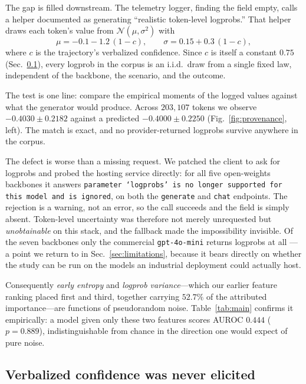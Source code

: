 \documentclass[conference]{IEEEtran}
\begin{document}
The gap is filled downstream. The telemetry logger, finding the field empty,
calls a helper documented as generating ``realistic token-level logprobs.''
That helper draws each token's value from $\mathcal{N}(\mu, \sigma^2)$ with
\begin{equation}
\mu = -0.1 - 1.2\,(1 - c), \qquad
\sigma = 0.15 + 0.3\,(1 - c),
\end{equation}
where $c$ is the trajectory's verbalized confidence. Since $c$ is itself a
constant $0.75$ (Sec.~\ref{sec:verbal}), every logprob in the corpus is an
i.i.d.\ draw from a single fixed law, independent of the backbone, the scenario,
and the outcome.

The test is one line: compare the empirical moments of the logged values against
what the generator would produce. Across $203{,}107$ tokens we observe
$-0.4030 \pm 0.2182$ against a predicted $-0.4000 \pm 0.2250$
(Fig.~\ref{fig:provenance}, left). The match is exact, and no provider-returned
logprobs survive anywhere in the corpus.

The defect is worse than a missing request. We patched the client to ask for
logprobs and probed the hosting service directly: for all five open-weights
backbones it answers \texttt{parameter `logprobs' is no longer supported for
this model and is ignored}, on both the \texttt{generate} and \texttt{chat}
endpoints. The rejection is a warning, not an error, so the call succeeds and
the field is simply absent. Token-level uncertainty was therefore not merely
unrequested but \emph{unobtainable} on this stack, and the fallback made the
impossibility invisible. Of the seven backbones only the commercial
\texttt{gpt-4o-mini} returns logprobs at all --- a point we return to in
Sec.~\ref{sec:limitations}, because it bears directly on whether the study can
be run on the models an industrial deployment could actually host.

Consequently \emph{early entropy} and \emph{logprob variance}---which our
earlier feature ranking placed first and third, together carrying $52.7\%$ of
the attributed importance---are functions of pseudorandom noise. Table~\ref{tab:main}
confirms it empirically: a model given only these two features scores AUROC
$0.444$ ($p = 0.889$), indistinguishable from chance in the direction one would
expect of pure noise.

\subsection{Verbalized confidence was never elicited}
\label{sec:verbal}
\end{document}
